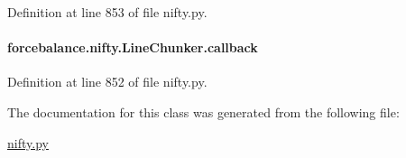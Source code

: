 Definition at line 853 of file nifty.\-py.

\hypertarget{classforcebalance_1_1nifty_1_1LineChunker_aadc78efc999ffbb1decfeb593d8a3b69}{
\paragraph[{callback}]{\setlength{\rightskip}{0pt plus 5cm}forcebalance.\-nifty.\-Line\-Chunker.\-callback}}\label{classforcebalance_1_1nifty_1_1LineChunker_aadc78efc999ffbb1decfeb593d8a3b69}


Definition at line 852 of file nifty.\-py.



The documentation for this class was generated from the following file\-:\begin{DoxyCompactItemize}
\item 
\hyperlink{nifty_8py}{nifty.\-py}\end{DoxyCompactItemize}
